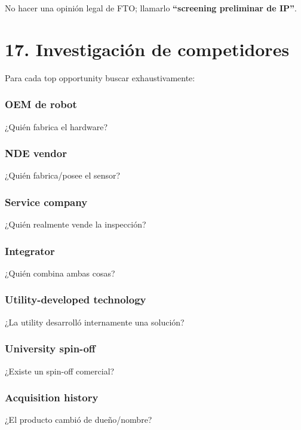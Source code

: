 \documentclass[11pt,a4paper]{article}
\begin{document}
No hacer una opinión legal de FTO; llamarlo \textbf{``screening preliminar de IP''}.


\section*{17. Investigación de competidores}
Para cada top opportunity buscar exhaustivamente:


\subsubsection*{OEM de robot}
¿Quién fabrica el hardware?


\subsubsection*{NDE vendor}
¿Quién fabrica/posee el sensor?


\subsubsection*{Service company}
¿Quién realmente vende la inspección?


\subsubsection*{Integrator}
¿Quién combina ambas cosas?


\subsubsection*{Utility-developed technology}
¿La utility desarrolló internamente una solución?


\subsubsection*{University spin-off}
¿Existe un spin-off comercial?


\subsubsection*{Acquisition history}
¿El producto cambió de dueño/nombre?
\end{document}
